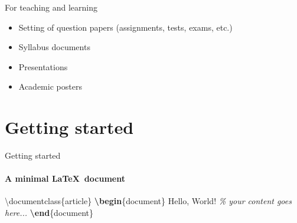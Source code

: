 \documentclass[,aspectratio=43]{beamer}
\newcommand{\VERB}{\Verb[commandchars=\\\{\}]}
\newenvironment{Shaded}{\begin{snugshade}}{\end{snugshade}}
\newcommand{\BuiltInTok}[1]{#1}
\newcommand{\CommentTok}[1]{\textcolor[rgb]{0.38,0.63,0.69}{\textit{#1}}}
\newcommand{\ExtensionTok}[1]{#1}
\newcommand{\KeywordTok}[1]{\textcolor[rgb]{0.00,0.44,0.13}{\textbf{#1}}}
\newcommand{\NormalTok}[1]{#1}
\providecommand{\tightlist}{%
  \setlength{\itemsep}{0pt}\setlength{\parskip}{0pt}}
\begin{document}
\begin{frame}{For teaching and learning}
\begin{itemize}
\tightlist
\item
  Setting of question papers (assignments, tests, exams, etc.)
\item
  Syllabus documents
\item
  Presentations
\item
  Academic posters
\end{itemize}
\end{frame}

\hypertarget{getting-started}{%
\section{Getting started}\label{getting-started}}

\begin{frame}[fragile]{Getting started}
\framesubtitle{A minimal \LaTeX\ document}

\begin{Shaded}
\begin{Highlighting}[]
\BuiltInTok{\textbackslash{}documentclass}\NormalTok{\{}\ExtensionTok{article}\NormalTok{\}}
\KeywordTok{\textbackslash{}begin}\NormalTok{\{}\ExtensionTok{document}\NormalTok{\}}
\NormalTok{Hello, World!  }\CommentTok{\% your content goes here...}
\KeywordTok{\textbackslash{}end}\NormalTok{\{}\ExtensionTok{document}\NormalTok{\}}
\end{Highlighting}
\end{Shaded}

\end{frame}
\end{document}
